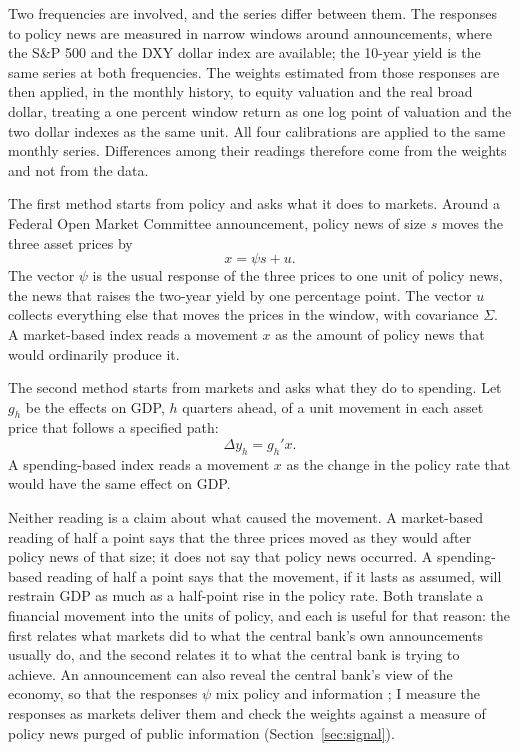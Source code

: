 \documentclass[11pt]{article}
\begin{document}
Two frequencies are involved, and the series differ between them. The responses to policy news are measured in narrow windows around announcements, where the S\&P 500 and the DXY dollar index are available; the 10-year yield is the same series at both frequencies. The weights estimated from those responses are then applied, in the monthly history, to equity valuation and the real broad dollar, treating a one percent window return as one log point of valuation and the two dollar indexes as the same unit. All four calibrations are applied to the same monthly series. Differences among their readings therefore come from the weights and not from the data.

The first method starts from policy and asks what it does to markets. Around a Federal Open Market Committee announcement, policy news of size $s$ moves the three asset prices by
\begin{equation}\label{eq:decomp}
x=\psi s+u .
\end{equation}
The vector $\psi$ is the usual response of the three prices to one unit of policy news, the news that raises the two-year yield by one percentage point. The vector $u$ collects everything else that moves the prices in the window, with covariance $\Sigma$. A market-based index reads a movement $x$ as the amount of policy news that would ordinarily produce it.

The second method starts from markets and asks what they do to spending. Let $g_h$ be the effects on GDP, $h$ quarters ahead, of a unit movement in each asset price that follows a specified path:
\begin{equation}\label{eq:spend}
\Delta y_h=g_h'x .
\end{equation}
A spending-based index reads a movement $x$ as the change in the policy rate that would have the same effect on GDP.

Neither reading is a claim about what caused the movement. A market-based reading of half a point says that the three prices moved as they would after policy news of that size; it does not say that policy news occurred. A spending-based reading of half a point says that the movement, if it lasts as assumed, will restrain GDP as much as a half-point rise in the policy rate. Both translate a financial movement into the units of policy, and each is useful for that reason: the first relates what markets did to what the central bank's own announcements usually do, and the second relates it to what the central bank is trying to achieve. An announcement can also reveal the central bank's view of the economy, so that the responses $\psi$ mix policy and information \citep{nakamura2018}; I measure the responses as markets deliver them and check the weights against a measure of policy news purged of public information (Section~\ref{sec:signal}).
\end{document}
